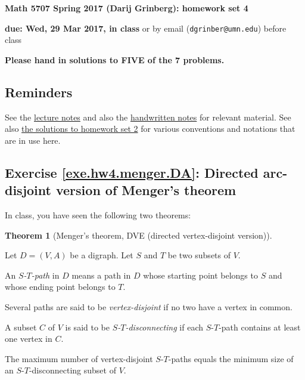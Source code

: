 \documentclass[numbers=enddot,12pt,final,onecolumn,notitlepage]{scrartcl}%
\theoremstyle{definition}
\newtheorem{theo}{Theorem}[section]
\newenvironment{theorem}[1][]
{\begin{theo}[#1]\begin{leftbar}}
{\end{leftbar}\end{theo}}
\newcommand{\tup}[1]{\left( #1 \right)}
\begin{document}
\begin{center}
\textbf{Math 5707 Spring 2017 (Darij Grinberg): homework set 4}

\textbf{due: Wed, 29 Mar 2017, in class} or by email
(\texttt{dgrinber@umn.edu}) before class

\textbf{Please hand in solutions to FIVE of the 7 problems.}
\end{center}


\subsection{Reminders}

See the
\href{http://www-users.math.umn.edu/~dgrinber/5707s17/nogra.pdf}{lecture notes}
and also the
\href{http://www-users.math.umn.edu/~dgrinber/5707s17/}{handwritten notes}
for relevant material.
See also
\href{http://www-users.math.umn.edu/~dgrinber/5707s17/hw2s.pdf}{the solutions to homework set 2}
for various conventions and notations that are in use here.

\subsection{Exercise \ref{exe.hw4.menger.DA}: Directed arc-disjoint
version of Menger's theorem}

In class, you have seen the following two theorems:

\begin{theorem}[Menger's theorem, DVE (directed vertex-disjoint
version)] \label{thm.menger.DVE}
Let $D = \tup{V, A}$ be a digraph.
Let $S$ and $T$ be two subsets of $V$.

An \textit{$S$-$T$-path} in $D$ means a path in $D$ whose starting
point belongs to $S$ and whose ending point belongs to $T$.

Several paths are said to be \textit{vertex-disjoint} if no two
have a vertex in common.

A subset $C$ of $V$ is said to be \textit{$S$-$T$-disconnecting} if
each $S$-$T$-path contains at least one vertex in $C$.

The maximum number of vertex-disjoint $S$-$T$-paths equals the
minimum size of an $S$-$T$-disconnecting subset of $V$.
\end{theorem}
\end{document}
